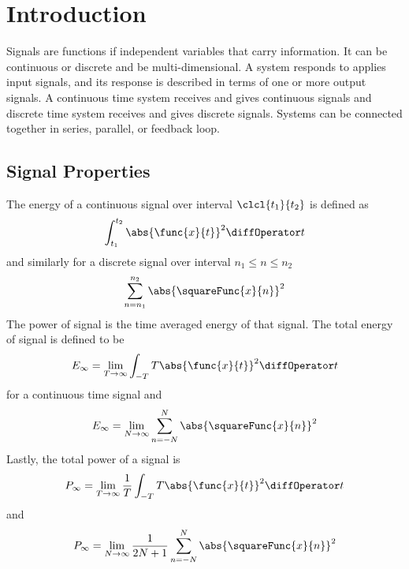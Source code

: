 \chapter{Introduction}
Signals are functions if independent variables that carry information. It can be continuous or discrete and be multi-dimensional.
A system responds to applies input signals, and its response is described in terms of one or more output signals. A continuous time system receives and gives continuous signals and discrete time system receives and gives discrete signals. Systems can be connected together in series, parallel, or feedback loop.

\section{Signal Properties}
\begin{definition}
    The energy of a continuous signal over interval \(\clcl{t_1}{t_2}\) is defined as 
    \begin{equation*}
        \int_{t_1}^{t_2} \abs{\func{x}{t}}^2 \diffOperator t
    \end{equation*}
    and similarly for a discrete signal over interval \(n_1 \leq n \leq n_2\)
    \begin{equation*}
        \sum_{n = n_1}^{n_2} \abs{\squareFunc{x}{n}}^2 
    \end{equation*}
    The power of signal is the time averaged energy of that signal. The total energy of signal is defined to be 
    \begin{equation*}
        E_{\infty} = \lim_{T \to \infty} \int_{-T}{T} \abs{\func{x}{t}}^2 \diffOperator t
    \end{equation*}
    for a continuous time signal and 
    \begin{equation*}
        E_{\infty} =\lim_{N \to \infty}\sum_{n = -N}^{N} \abs{\squareFunc{x}{n}}^2 
    \end{equation*}
    Lastly, the total power of a signal is 
    \begin{equation*}
        P_{\infty} = \lim_{T \to \infty} \dfrac{1}{T} \int_{-T}{T} \abs{\func{x}{t}}^2 \diffOperator t
    \end{equation*}
    and 
    \begin{equation*}
        P_{\infty} =\lim_{N \to \infty} \dfrac{1}{2N + 1} \sum_{n = -N}^{N} \abs{\squareFunc{x}{n}}^2
    \end{equation*}
\end{definition}


